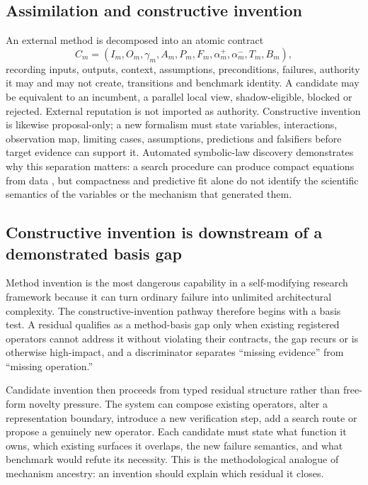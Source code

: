 \subsection{Assimilation and constructive invention}
An external method is decomposed into an atomic contract
\begin{equation}C_m=(I_m,O_m,\gamma_m,A_m,P_m,F_m,\alpha_m^+,\alpha_m^-,T_m,B_m),\end{equation}
recording inputs, outputs, context, assumptions, preconditions, failures, authority it may and may not create, transitions and benchmark identity. A candidate may be equivalent to an incumbent, a parallel local view, shadow-eligible, blocked or rejected. External reputation is not imported as authority. Constructive invention is likewise proposal-only; a new formalism must state variables, interactions, observation map, limiting cases, assumptions, predictions and falsifiers before target evidence can support it. Automated symbolic-law discovery demonstrates why this separation matters: a search procedure can produce compact equations from data \cite{schmidt2009}, but compactness and predictive fit alone do not identify the scientific semantics of the variables or the mechanism that generated them.

\subsection{Constructive invention is downstream of a demonstrated basis gap}

Method invention is the most dangerous capability in a self-modifying research framework because it can turn ordinary failure into unlimited architectural complexity. The constructive-invention pathway therefore begins with a basis test. A residual qualifies as a method-basis gap only when existing registered operators cannot address it without violating their contracts, the gap recurs or is otherwise high-impact, and a discriminator separates ``missing evidence'' from ``missing operation.''

Candidate invention then proceeds from typed residual structure rather than free-form novelty pressure. The system can compose existing operators, alter a representation boundary, introduce a new verification step, add a search route or propose a genuinely new operator. Each candidate must state what function it owns, which existing surfaces it overlaps, the new failure semantics, and what benchmark would refute its necessity. This is the methodological analogue of mechanism ancestry: an invention should explain which residual it closes.

